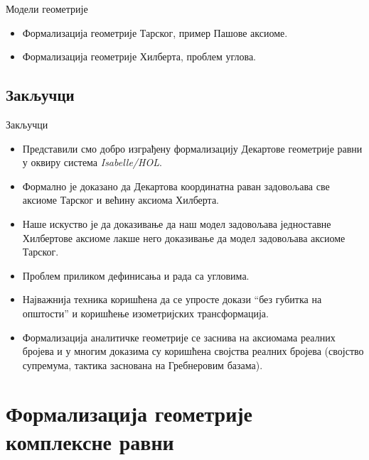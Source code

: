 \documentclass[slidestop, compress, mathserif, containsverbatim, xcolor=dvipsnames]{beamer}
\begin{document}
\begin{frame}{Модели геометрије}
  \begin{itemize}
  \item Формализација геометрије Тарског, пример Пашове аксиоме. \vfill
  \item Формализација геометрије Хилберта, проблем углова. \vfill
  \end{itemize}
\end{frame}


\subsection*{Закључци}

\begin{frame}[shrink]{Закључци}
  \begin{itemize}
  \item Представили смо добро изграђену формализацију Декартове
    геометрије равни у оквиру система \emph{Isabelle/HOL}.
  \item Формално је доказано да Декартова координатна раван задовољава
    све аксиоме Тарског и већину аксиома Хилберта.
  \item Наше искуство је да доказивање да наш модел задовољава
    једноставне Хилбертове аксиоме лакше него доказивање да модел
    задовољава аксиоме Тарског.
  \item Проблем приликом дефинисања и рада са угловима.
  \item Најважнија техника коришћена да се упросте докази ``без
    губитка на општости'' и коришћење изометријских трансформација.
  \item Формализација аналитичке геометрије се заснива на аксиомама
    реалних бројева и у многим доказима су коришћена својства реалних
    бројева (својство супремума, тактика заснована на Гребнеровим
    базама).
  \end{itemize}
\end{frame}


\section{Формализација геометрије комплексне равни}
\end{document}
